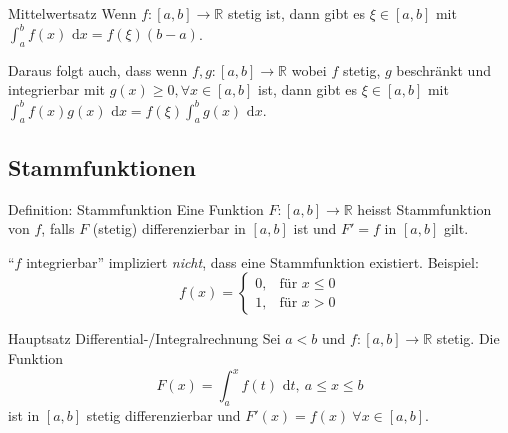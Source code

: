 \documentclass[a4paper,10pt]{article}
\def\R{\mathbb{R}}
\def\dx{\text{ d}x}
\begin{document}
\begin{mainbox}{Mittelwertsatz}
	Wenn $f: [a,b] \to \R$ stetig ist, dann gibt es $\xi \in [a,b]$ mit $\int_a^b f(x) \dx = f(\xi) (b-a)$.
\end{mainbox}
Daraus folgt auch, dass wenn $f,g: [a,b] \to \R$ wobei $f$ stetig, $g$ beschränkt und integrierbar mit $g(x) \ge 0, \forall x \in [a,b]$ ist, dann gibt es $\xi \in [a,b]$ mit $\int_a^b f(x)g(x) \dx = f(\xi) \int_a^b g(x) \dx$.

\subsection{Stammfunktionen}
\begin{subbox}{Definition: Stammfunktion}
	Eine Funktion $F: [a,b] \to \R$ heisst Stammfunktion von $f$, falls $F$ (stetig) differenzierbar in $[a,b]$ ist und $F' = f$ in $[a,b]$ gilt.
\end{subbox}
``$f$ integrierbar'' impliziert \textit{nicht}, dass eine Stammfunktion existiert. Beispiel:
$$
f(x) = \begin{cases}
0, & \text{für } x \le 0 \\
1, & \text{für } x > 0
\end{cases}
$$

\begin{mainbox}{Hauptsatz Differential-/Integralrechnung}
	Sei $a<b$ und $f: [a,b] \to \R$ stetig. Die Funktion 
	$$F(x) = \int_a^x f(t) \text{ d}t, \ a \le x \le b$$
	ist in $[a,b]$ stetig differenzierbar und $F'(x) = f(x) \ \forall x \in [a,b]$.
\end{mainbox}
\end{document}
